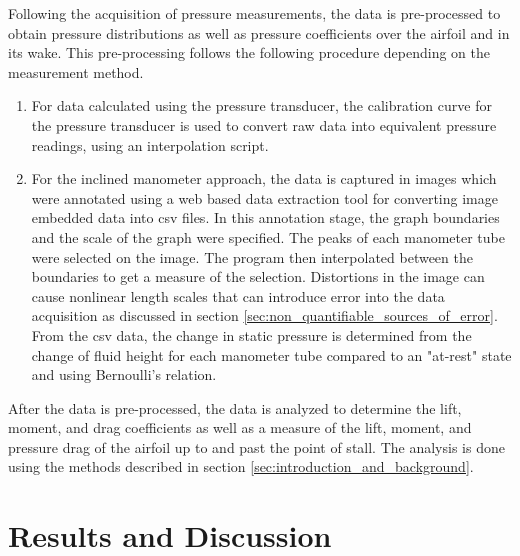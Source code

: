 \documentclass[runningheads]{llncs}
\begin{document}
\noindent
Following the acquisition of pressure measurements, the data is pre-processed to obtain pressure distributions as well as pressure coefficients over the airfoil and in its wake. This pre-processing follows the following procedure depending on the measurement method.

\begin{enumerate}

    \item For data calculated using the pressure transducer, the calibration curve for the pressure transducer is used to convert raw data into equivalent pressure readings, using an interpolation script.

    \item For the inclined manometer approach, the data is captured in images which were annotated using a web based data extraction tool for converting image embedded data into csv files.\cite{Rohatgi2020} In this annotation stage, the graph boundaries and the scale of the graph were specified. The peaks of each manometer tube were selected on the image. The program then interpolated between the boundaries to get a measure of the selection. Distortions in the image can cause nonlinear length scales that can introduce error into the data acquisition as discussed in section \ref{sec:non_quantifiable_sources_of_error}. From the csv data, the change in static pressure is determined from the change of fluid height for each manometer tube compared to an "at-rest" state and using Bernoulli's relation.

\end{enumerate}

\noindent
After the data is pre-processed, the data is analyzed to determine the lift, moment, and drag coefficients as well as a measure of the lift, moment, and pressure drag of the airfoil up to and past the point of stall. The analysis is done using the methods described in section \ref{sec:introduction_and_background}.\newline




\section{Results and Discussion}
\end{document}
